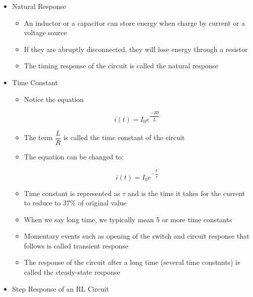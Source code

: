 \begin{itemize}

  \item Natural Response

    \begin{itemize}

      \item An inductor or a capacitor can store energy when charge by current or a voltage source

      \item If they are abruptly disconnected, they will lose energy through a resistor

      \item The timing response of the circuit is called the natural response

    \end{itemize}

  \item Time Constant

    \begin{itemize}

      \item Notice the equation

      $$\boxed{i(t)=I_0e^{\dfrac{-Rt}{L}}}$$

      \item The term $\dfrac{L}{R}$ is called the time constant of the circuit

      \item The equation can be changed to:

        $$\boxed{i(t)= I_0e^{-\dfrac{t}{\tau}}}$$

        \item Time constant is represented as $\tau$ and is the time it takes for the current to reduce to 37\% of original value

        \item When we say long time, we typically mean 5 or more time constants

        \item Momentary events such as opening of the switch and circuit response that follows is called transient response

        \item The response of the circuit after a long time (several time constants) is called the steady-state response

    \end{itemize}

  \item Step Response of an RL Circuit


\end{itemize}
